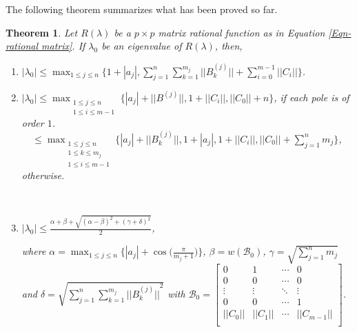 \documentclass[12pt, reqno]{amsart}
\newtheorem{theorem}{Theorem}[section]
\theoremstyle{definition}
\theoremstyle{remark}
\numberwithin{equation}{section}
\begin{document}
\medskip
The following theorem summarizes what has been proved so far.

\begin{theorem}\label{Thm summary}
Let $R(\lambda)$ be a $p \times p$ matrix rational function as in Equation \eqref{Eqn- rational matrix}. 
If $\lambda_0$ be an eigenvalue of $R(\lambda)$, then,

\begin{enumerate}
\item $\displaystyle  |\lambda_0| \leq \max_{1 \leq j \leq n} \bigg\{1+|a_j|, 
\sum_{j=1}^{n} \sum_{k=1}^{m_j}||B_k^{(j)}||+ \sum_{i=0}^{m-1}||C_i|| \bigg\}$.

\item 
$ |\lambda_0| \leq 
\displaystyle \max_{\substack{\text{$1 \leq j \leq n$}\\ \text {$1 \leq i \leq m-1$}}} 
\bigg\{|a_j|+||B^{(j)}||, 1+||C_i||, ||C_0||+ n \bigg\}$, if each pole is of order $1$.\\


\ \ $\leq \displaystyle \max_{\substack{\text{$1 \leq j \leq n$}\\ 
\text{$1 \leq k \leq m_j$} \\ \text {$1 \leq i \leq m-1$}}} 
\bigg\{|a_j|+||B_k^{(j)}||, 1+|a_j|, 1+||C_i||, ||C_0||+ 
\sum_{j=1}^{n}m_j \bigg\}$, otherwise.

\
\item $|\lambda_0| \leq \displaystyle \frac{\alpha+ \beta +\sqrt{(\alpha-\beta)^2 + 
(\gamma+\delta)^2}}{2}$,

where $\alpha = \displaystyle \max_{1 \leq j \leq n} \Big\{|a_j| + 
\cos\Big(\frac{\pi}{m_j+1}\Big) \Big\}$, $\beta = w(\mathcal{B}_0)$, $\gamma =
\sqrt{\displaystyle \sum_{j=1}^{n} m_j}$ and $\delta = \sqrt{ \displaystyle 
\sum_{j=1}^{n}\sum_{k=1}^{m_j} {||B_{k}^{(j)}||}^2}$ with $\mathcal{B}_0 = 
\begin{bmatrix}
0 & 1  & \cdots & 0\\
0 & 0 & \cdots & 0\\
\vdots  & \vdots & \ddots & \vdots\\
0 & 0 & \cdots & 1\\
||C_0|| & ||C_1|| & \cdots & ||C_{m-1}||\\ 
\end{bmatrix}$.
\end{enumerate}
\end{theorem}
\end{document}
